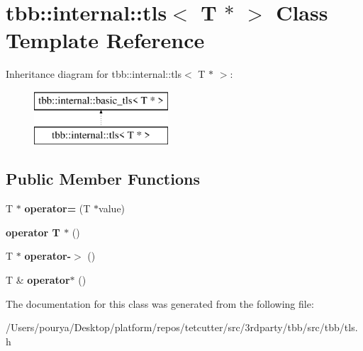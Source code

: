 \hypertarget{classtbb_1_1internal_1_1tls_3_01T_01_5_01_4}{}\section{tbb\+:\+:internal\+:\+:tls$<$ T $\ast$ $>$ Class Template Reference}
\label{classtbb_1_1internal_1_1tls_3_01T_01_5_01_4}
Inheritance diagram for tbb\+:\+:internal\+:\+:tls$<$ T $\ast$ $>$\+:\begin{figure}[H]
\begin{center}
\leavevmode
\includegraphics[height=2.000000cm]{classtbb_1_1internal_1_1tls_3_01T_01_5_01_4}
\end{center}
\end{figure}
\subsection*{Public Member Functions}
\begin{DoxyCompactItemize}
\item 
\hypertarget{classtbb_1_1internal_1_1tls_3_01T_01_5_01_4_ab2300cb689eb0f78cabf43eef1ac40fc}{}T $\ast$ {\bfseries operator=} (T $\ast$value)\label{classtbb_1_1internal_1_1tls_3_01T_01_5_01_4_ab2300cb689eb0f78cabf43eef1ac40fc}

\item 
\hypertarget{classtbb_1_1internal_1_1tls_3_01T_01_5_01_4_a39af2eb4320c3fe1a2285a6df307c40d}{}{\bfseries operator T $\ast$} ()\label{classtbb_1_1internal_1_1tls_3_01T_01_5_01_4_a39af2eb4320c3fe1a2285a6df307c40d}

\item 
\hypertarget{classtbb_1_1internal_1_1tls_3_01T_01_5_01_4_a3831aed21c13c3f31929e635fa8c44e0}{}T $\ast$ {\bfseries operator-\/$>$} ()\label{classtbb_1_1internal_1_1tls_3_01T_01_5_01_4_a3831aed21c13c3f31929e635fa8c44e0}

\item 
\hypertarget{classtbb_1_1internal_1_1tls_3_01T_01_5_01_4_aa4b20985ce2ea6c1d12f033841f6a6a0}{}T \& {\bfseries operator$\ast$} ()\label{classtbb_1_1internal_1_1tls_3_01T_01_5_01_4_aa4b20985ce2ea6c1d12f033841f6a6a0}

\end{DoxyCompactItemize}


The documentation for this class was generated from the following file\+:\begin{DoxyCompactItemize}
\item 
/\+Users/pourya/\+Desktop/platform/repos/tetcutter/src/3rdparty/tbb/src/tbb/tls.\+h\end{DoxyCompactItemize}
